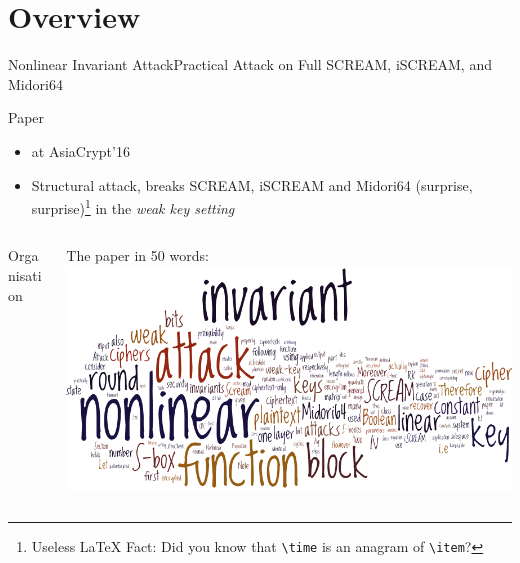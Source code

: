 \section{Overview}
\begin{frame}{Nonlinear Invariant Attack}{Practical Attack on Full SCREAM, iSCREAM, and Midori64}
    \begin{block}{Paper}
        \begin{itemize}
            \item \textcite{AC16:TLS} at AsiaCrypt'16
            \item Structural attack, breaks SCREAM, iSCREAM and Midori64
                  (surprise, surprise)\footnote{Useless \LaTeX{} Fact: Did you know that \texttt{\textbackslash{}time} is an anagram of \texttt{\textbackslash{}item}?}
                  in the \emph{weak key setting}
        \end{itemize}
    \end{block}
    \vspace{-1em}
    \begin{columns}[T]
        \begin{column}{0.45\textwidth}
            \begin{block}{Organisation}
                \vspace{0.5em}
                \tableofcontents
            \end{block}
        \end{column}
        \begin{column}{0.45\textwidth}
            \begin{block}{The paper in 50 words:}
                \centering
                \includegraphics[keepaspectratio,width=\textwidth]{data/wordle.png}
            \end{block}
        \end{column}
    \end{columns}
\end{frame}

